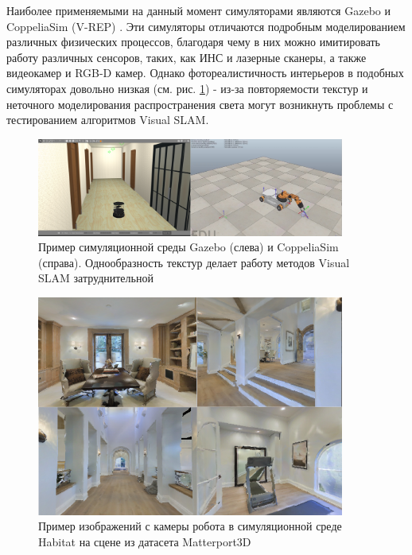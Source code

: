 \documentclass{mipt-thesis-ms}
\begin{document}
	Наиболее применяемыми на данный момент симуляторами являются Gazebo \cite{koenig2004design} и CoppeliaSim (V-REP) \cite{rooban2021coppeliasim}. Эти симуляторы отличаются подробным моделированием различных физических процессов, благодаря чему в них можно имитировать работу различных сенсоров, таких, как ИНС и лазерные сканеры, а также видеокамер и RGB-D камер. Однако фотореалистичность интерьеров в подобных симуляторах довольно низкая (см. рис. \ref{figure_gazebo_vrep}) - из-за повторяемости текстур и неточного моделирования распространения света могут возникнуть проблемы с тестированием алгоритмов Visual SLAM.
	
	\begin{figure}
		\centering
		\includegraphics[width=0.9\textwidth]{img/gazebo_vrep.png}
		\caption{Пример симуляционной среды Gazebo (слева) и CoppeliaSim (справа). Однообразность текстур делает работу методов Visual SLAM затруднительной}
		\label{figure_gazebo_vrep}
	\end{figure}

	\begin{figure}
		\centering
		\includegraphics[width=0.9\textwidth]{img/habitat.png}
		\caption{Пример изображений с камеры робота в симуляционной среде Habitat на сцене из датасета Matterport3D}
		\label{figure_habitat}
	\end{figure}
	
\end{document}

